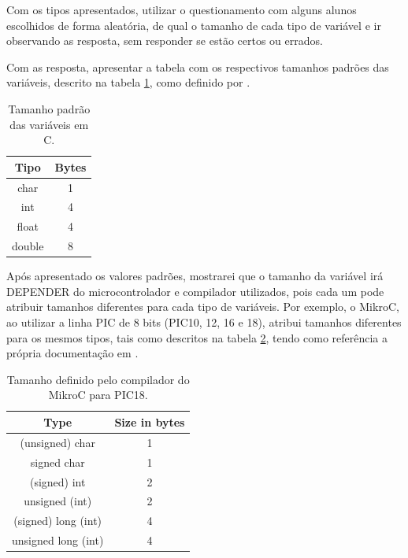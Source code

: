 \documentclass[12pt,a4paper]{report}
\begin{document}
Com os tipos apresentados, utilizar o questionamento com alguns alunos escolhidos de forma aleatória, de qual o tamanho de cada tipo de variável e ir observando as resposta, sem responder se estão certos ou errados.

Com as resposta, apresentar a tabela com os respectivos tamanhos padrões das variáveis, descrito na tabela \ref{table:c_types_size}, como definido por \cite{ci:c_types}.

\begin{table}[H]
    \centering
    \caption{Tamanho padrão das variáveis em C.}
    \begin{tabular}{c|c}
    \textbf{Tipo} & \textbf{Bytes} \\ \hline
    char          & 1              \\ 
    int           & 4              \\
    float         & 4              \\ 
    double        & 8              \\ 
    \end{tabular}
    \label{table:c_types_size}
\end{table}

Após apresentado os valores padrões, mostrarei que o tamanho da variável irá DEPENDER do microcontrolador e compilador utilizados, pois cada um pode atribuir tamanhos diferentes para cada tipo de variáveis. Por exemplo, o MikroC, ao utilizar a linha PIC de 8 bits (PIC10, 12, 16 e 18), atribui tamanhos diferentes para os mesmos tipos, tais como descritos na tabela \ref{table:mikroc_sizes}, tendo como referência a própria documentação em \cite{ci:mikroc_c_types}.

\begin{table}[H]
    \centering
    \caption{Tamanho definido pelo compilador do MikroC para PIC18.}
    \begin{tabular}{c|c}
    \textbf{Type}       & \textbf{Size in bytes} \\ \hline
    (unsigned) char     & 1                      \\
    signed char         & 1                      \\
    (signed) int        & 2                      \\
    unsigned (int)      & 2                      \\
    (signed) long (int) & 4                      \\
    unsigned long (int) & 4                     
    \end{tabular}
    \label{table:mikroc_sizes}
\end{table}
\end{document}
